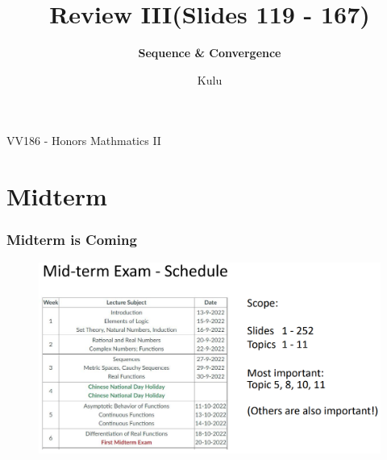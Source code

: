 \documentclass{beamer}
\title{\sffamily Review III(Slides 119 - 167)}
\subtitle{\textbf{Sequence \& Convergence}\\ }
\institute[UM-SJTU JI]{University of Michigan-Shanghai Jiao Tong University Joint Institute}
\author{Kulu}
\newcommand{\myfont}{\rmfamily\normalsize\upshape\mdseries}
\begin{document}
\begin{titlepage}
    \begin{center}
        VV186 - Honors Mathmatics II
    \end{center}
\end{titlepage}
\myfont

\section{Midterm}
\begin{frame}
    \frametitle{Midterm is Coming}
    \begin{figure}[htbp]
        \centering
        \includegraphics[width=12cm]{syllabus.png}
    \end{figure}
\end{frame}
\end{document}
